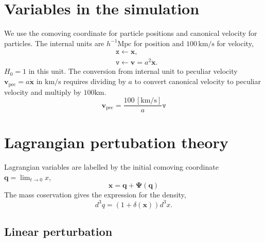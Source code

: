 \documentclass[a4paper]{article}
\begin{document}
\section{Variables in the simulation}
We use the comoving coordinate for particle positions and canonical
velocity for particles. The internal units are $h^{-1}
\mathrm{Mpc}$ for position and $100 \,\mathrm{km/s}$ for velocity, 
\begin{align}
  &\texttt{x} \leftarrow \bm{x},\\
  &\texttt{v} \leftarrow \bm{v} = a^2 \dot{\bm{x}}.
\end{align}
$H_0 = 1$ in this unit.
%
The conversion from internal unit to peculiar velocity
$\bm{v}_\mathrm{pec} = a \dot{\bm{x}}$ in $\mathrm{km}/\mathrm{s}$
requires dividing by $a$ to convert canonical velocity to peculiar
velocity and multiply by $100
\mathrm{km}$.
\begin{equation}
  \bm{v}_\mathrm{pec} = \frac{100 \,\mathrm{[km/s]}}{a} \texttt{v}
\end{equation}


\section{Lagrangian pertubation theory}
Lagrangian variables are labelled by the initial comoving coordinate $\bm{q} = \lim_{t \rightarrow 0} x$,
\begin{equation}
  \bm{x} = \bm{q} + \bm{\Psi}(\bm{q})
\end{equation}
The mass coservation gives the expression for the density,
\begin{equation}
  d^3 q = (1 + \delta(\bm{x})) d^3 x.
\end{equation}

\subsection{Linear perturbation}
\end{document}
